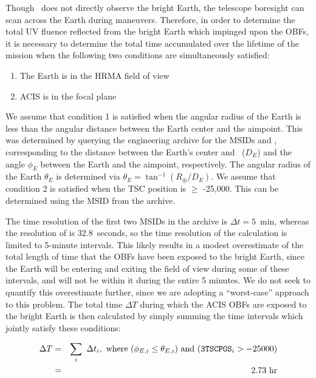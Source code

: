 \documentclass[11pt]{article}
\begin{document}
Though \chandra~does not directly observe the bright Earth, the telescope boresight can scan
across the Earth during maneuvers. Therefore, in order to determine the total UV fluence
reflected from the bright Earth which impinged upon the OBFs, it is necessary to determine
the total time accumulated over the lifetime of the mission when the following two conditions
are simultaneously satisfied:

\begin{enumerate}
\item The Earth is in the HRMA field of view
\item ACIS is in the focal plane
\end{enumerate}

We assume that condition 1 is satisfied when the angular radius of the Earth is less than the
angular distance between the Earth center and the aimpoint. This was determined by querying
the  engineering archive for the MSIDs  and ,
corresponding to the distance between the Earth's center and \chandra~($D_E$) and the angle $\phi_E$ between
the Earth and the aimpoint, respectively. The angular radius of the Earth $\theta_E$ is determined
via $\theta_E = \tan^{-1} (R_\oplus/D_E)$. We assume that condition 2 is satisfied when the TSC
position is $\geq$ -25,000. This can be determined using the MSID  from the 
archive.

The time resolution of the first two MSIDs in the archive is $\Delta{t} = 5$~min, whereas the resolution
of  is 32.8~seconds, so the time resolution of the calculation is limited to 5-minute intervals.
This likely results in a modest overestimate of the total length of time that the OBFs have been exposed to
the bright Earth, since the Earth will be entering and exiting the field of view during some of these intervals,
and will not be within it during the entire 5 minutes. We do not seek to quantify this overestimate further,
since we are adopting a ``worst-case'' approach to this problem. The total time $\Delta{T}$ during which the ACIS
OBFs are exposed to the bright Earth is then calculated by simply summing the time intervals which jointly satisfy
these conditions:

\begin{eqnarray}
\Delta{T} &=& \displaystyle\sum_i~\Delta{t_i},~{\rm where}~(\phi_{E,i} \leq \theta_{E,i})~{\rm and}~(\texttt{3TSCPOS}_i > -25000) \\
\nonumber &=& 2.73~{\rm hr}
\end{eqnarray}
\end{document}
